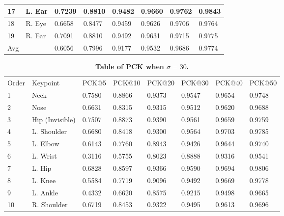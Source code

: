 \documentclass[10pt,letterpaper]{article}
\newlength\savedwidth
\newcommand\thickhline{\noalign{\global\savedwidth\arrayrulewidth\global\arrayrulewidth 2pt}%
	\hline
	\noalign{\global\arrayrulewidth\savedwidth}}
\begin{document}
\begin{table}[!ht]
\begin{adjustwidth}{-2.25in}{0in}
\begin{tabular}{|l|l|l|l|l|l|l|l|}
			17    &  L. Ear        &  0.7239 & 0.8810 & 0.9482 & 0.9660 & 0.9762 & 0.9843      \\ \hline
			18    &  R. Eye        & 0.6658 & 0.8477 & 0.9459 & 0.9626 & 0.9706 & 0.9764       \\ \hline
			19    &  R. Ear        & 0.7091 & 0.8810 & 0.9492 & 0.9631 & 0.9715 & 0.9775      \\ \hline
			Avg    &  &  0.6056 & 0.7996 & 0.9177 & 0.9532 & 0.9686 & 0.9774             \\ \hline
		\end{tabular}
		\label{table:PCKsigma20}
	\end{adjustwidth}
\end{table}
	
\begin{table}[!ht]
	\begin{adjustwidth}{-2.25in}{0in} %
		\centering
		\caption{
			{\bf Table of PCK when $\sigma=30$.}}
		\begin{tabular}{|l|l|l|l|l|l|l|l|}
			\hline
			Order & Keypoint & PCK@5 & PCK@10 & PCK@20 & PCK@30 & PCK@40 & PCK@50 \\ \thickhline
			1     &  Neck    & 0.7580 & 0.8866 & 0.9373 & 0.9547 & 0.9654 & 0.9748      \\ \hline
			2     &  Nose     & 0.6631 & 0.8315 & 0.9315 & 0.9512 & 0.9620 & 0.9688       \\ \hline
			3     &  Hip (Invisible)     & 0.7507 & 0.8873 & 0.9390 & 0.9561 & 0.9659 & 0.9759      \\ \hline
			4     &  L. Shoulder      & 0.6680 & 0.8418 & 0.9300 & 0.9564 & 0.9703 & 0.9785      \\ \hline
			5     &  L. Elbow      & 0.6143 & 0.7760 & 0.8943 & 0.9426 & 0.9644 & 0.9740     \\ \hline
			6     &  L. Wrist     & 0.3116 & 0.5755 & 0.8023 & 0.8888 & 0.9316 & 0.9541      \\ \hline
			7     &  L. Hip     & 0.6828 & 0.8597 & 0.9366 & 0.9590 & 0.9694 & 0.9806      \\ \hline
			8     &  L. Knee      & 0.5584 & 0.7719 & 0.9096 & 0.9492 & 0.9669 & 0.9778      \\ \hline
			9     &  L. Ankle      & 0.4332 & 0.6620 & 0.8575 & 0.9215 & 0.9498 & 0.9665      \\ \hline
			10    &  R. Shoulder     & 0.6719 & 0.8453 & 0.9322 & 0.9495 & 0.9613 & 0.9696      \\ \hline

\end{tabular}
\end{adjustwidth}
\end{table}
\end{document}
